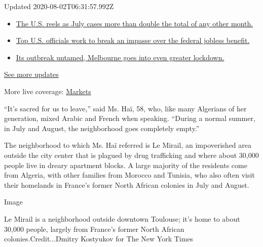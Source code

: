 Updated 2020-08-02T06:31:57.992Z

\begin{itemize}
\tightlist
\item
  \href{https://www.nytimes.com/2020/08/01/world/coronavirus-covid-19.html?action=click\&pgtype=Article\&state=default\&region=MAIN_CONTENT_1\&context=storylines_live_updates\#link-34047410}{The
  U.S. reels as July cases more than double the total of any other
  month.}
\item
  \href{https://www.nytimes.com/2020/08/01/world/coronavirus-covid-19.html?action=click\&pgtype=Article\&state=default\&region=MAIN_CONTENT_1\&context=storylines_live_updates\#link-780ec966}{Top
  U.S. officials work to break an impasse over the federal jobless
  benefit.}
\item
  \href{https://www.nytimes.com/2020/08/01/world/coronavirus-covid-19.html?action=click\&pgtype=Article\&state=default\&region=MAIN_CONTENT_1\&context=storylines_live_updates\#link-2bc8948}{Its
  outbreak untamed, Melbourne goes into even greater lockdown.}
\end{itemize}

\href{https://www.nytimes.com/2020/08/01/world/coronavirus-covid-19.html?action=click\&pgtype=Article\&state=default\&region=MAIN_CONTENT_1\&context=storylines_live_updates}{See
more updates}

More live coverage:
\href{https://www.nytimes.com/live/2020/07/31/business/stock-market-today-coronavirus?action=click\&pgtype=Article\&state=default\&region=MAIN_CONTENT_1\&context=storylines_live_updates}{Markets}

``It's sacred for us to leave,'' said Ms. Haï, 58, who, like many
Algerians of her generation, mixed Arabic and French when speaking.
``During a normal summer, in July and August, the neighborhood goes
completely empty.''

The neighborhood to which Ms. Haï referred is Le Mirail, an impoverished
area outside the city center that is plagued by drug trafficking and
where about 30,000 people live in dreary apartment blocks. A large
majority of the residents come from Algeria, with other families from
Morocco and Tunisia, who also often visit their homelands in France's
former North African colonies in July and August.

Image

Le Mirail is a neighborhood outside downtown Toulouse; it's home to
about 30,000 people, largely from France's former North African
colonies.Credit...Dmitry Kostyukov for The New York Times

